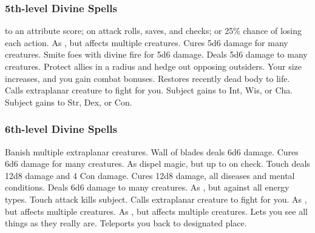 \subsubsection{5th-level Divine Spells}
\begin{spelllist}
    to an attribute score;  on attack rolls, saves, and checks; or 25\% chance of losing each action.
   As , but affects multiple creatures.
   Cures 5d6 damage for many creatures.
   Smite foes with divine fire for 5d6 damage.
   Deals 5d6 damage to many creatures.
   Protect allies in a \areamed radius and hedge out opposing outsiders.
   Your size increases, and you gain combat bonuses.
   Restores recently dead body to life.
   Calls extraplanar creature to fight for you.
   Subject gains  to Int, Wis, or Cha.
   Subject gains  to Str, Dex, or Con.
\end{spelllist}

\subsubsection{6th-level Divine Spells}
\begin{spelllist}
   Banish multiple extraplanar creatures. 
   Wall of blades deals 6d6 damage.
   Cures 6d6 damage for many creatures.
   As dispel magic, but up to  on check.
   Touch deals 12d8 damage and 4 Con damage.
   Cures 12d8 damage, all diseases and mental conditions.
   Deals 6d6 damage to many creatures.
   As , but against all energy types.
   Touch attack kills subject.
   Calls extraplanar creature to fight for you.
   As , but affects multiple creatures.
   As , but affects multiple creatures.
  \M Lets you see all things as they really are.
   Teleports you back to designated place.
\end{spelllist}

